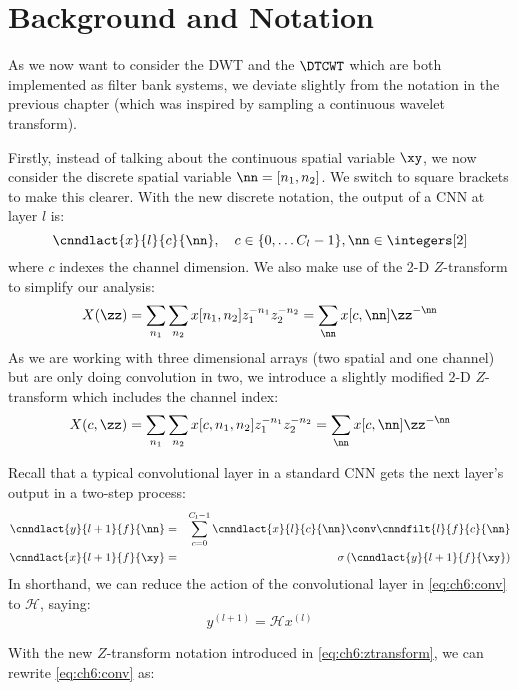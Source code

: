 \section{Background and Notation}
As we now want to consider the DWT and the $\DTCWT$ which are both implemented
as filter bank systems, we deviate slightly from the notation in the previous
chapter (which was inspired by sampling a continuous wavelet transform). 

Firstly, instead of talking about the continuous spatial variable $\xy$, we now
consider the discrete spatial variable $\nn = [n_1, n_2]$. We switch to square 
brackets to make this clearer. With the new discrete notation, the output of a CNN at layer $l$ is:
%
\begin{equation}
  \cnndlact{x}{l}{c}{\nn}, \quad c\in \{0, \ldots C_l-1\}, \nn \in \integers[2]
\end{equation}
%
where $c$ indexes the channel dimension. 
We also make use of the 2-D $Z$-transform to simplify our analysis:
%
\begin{equation}
  X(\zz) = \sum_{n_1}\sum_{n_2} x[n_1, n_2]z_1^{-n_1}z_2^{-n_2} =
  \sum_{\nn}x[c, \nn]\zz^{-\nn}
\end{equation}
%
As we are working with three dimensional arrays (two spatial and one channel) but are
only doing convolution in two, we introduce a slightly modified 2-D $Z$-transform
which includes the channel index:
%
\begin{equation}
  X(c, \zz) = \sum_{n_1}\sum_{n_2} x[c, n_1, n_2]z_1^{-n_1}z_2^{-n_2} =
  \sum_{\nn}x[c, \nn]\zz^{-\nn} \label{eq:ch6:ztransform}
\end{equation}

Recall that a typical convolutional
layer in a standard CNN gets the next layer's output in a two-step process:
%
\begin{eqnarray} 
  \cnndlact{y}{l+1}{f}{\nn} &=& \sum_{c=0}^{C_l - 1} \cnndlact{x}{l}{c}{\nn} \conv \cnndfilt{l}{f}{c}{\nn}
    \label{eq:ch6:conv}\\
    \cnndlact{x}{l+1}{f}{\xy} & = & \sigma \left( \cnndlact{y}{l+1}{f}{\xy} \right) \label{eq:ch6:nonlin}
\end{eqnarray}
%
In shorthand, we can reduce the action of the convolutional layer in \eqref{eq:ch6:conv} to $\mathcal{H}$, saying:
\begin{equation}
  y^{(l+1)} = \mathcal{H}x^{(l)}
\end{equation}

With the new $Z$-transform notation introduced in \eqref{eq:ch6:ztransform}, we
can rewrite \eqref{eq:ch6:conv} as:

